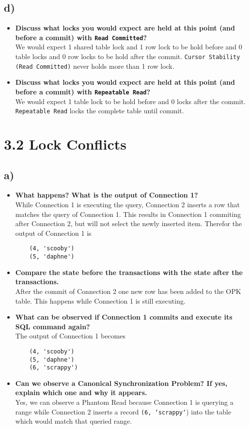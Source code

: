 \documentclass[a4paper,english,abstract=on]{scrartcl}
\begin{document}
\subsection*{d)}
\begin{itemize}
\item \textbf{Discuss what locks you would expect are held at this point (and before a commit) with \texttt{Read Committed}?}\\
We would expect 1 shared table lock and 1 row lock to be hold before and 0 table locks and 0 row locks to be hold after the commit. \texttt{Cursor Stability (Read Committed)} never holds more than 1 row lock.

\item \textbf{Discuss what locks you would expect are held at this point (and before a commit) with \texttt{Repeatable Read}?}\\
We would expect 1 table lock to be hold before and 0 locks after the commit. \texttt{Repeatable Read} locks the complete table until commit.
\end{itemize}

\section*{3.2 Lock Conflicts}
\subsection*{a)}
\begin{itemize}
	\item \textbf{What happens? What is the output of Connection 1?}\\
	While Connection 1 is executing the query, Connection 2 inserts a row that matches the query of Connection 1. This results in Connection 1 commiting after Connection 2, but will not select the newly inserted item. Therefor the output of Connection 1 is
	\begin{lstlisting}
	(4, 'scooby')
	(5, 'daphne')
	\end{lstlisting}
	\item \textbf{Compare the state before the transactions with the state after the transactions.}\\
	After the commit of Connection 2 one new row has been added to the OPK table. This happens while Connection 1 is still executing.
	\item \textbf{What can be observed if Connection 1 commits and execute its SQL command again?}\\
	The output of Connection 1 becomes
	\begin{lstlisting}
	(4, 'scooby')
	(5, 'daphne')
	(6, 'scrappy')
	\end{lstlisting}
	\item \textbf{Can we observe a Canonical Synchronization Problem? If yes, explain which one and why it appears.}\\
	Yes, we can observe a Phantom Read because Connection 1 is querying a range while Connection 2 inserts a record \texttt{(6, `scrappy`}) into the table which would match that queried range.
\end{itemize}
\end{document}
